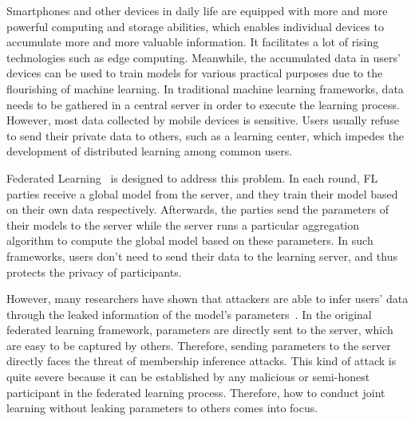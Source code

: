 Smartphones and other devices in daily life are equipped with more and more powerful computing and storage abilities, which enables individual devices to accumulate more and more valuable information. It facilitates a lot of rising technologies such as edge computing. Meanwhile, the accumulated data in users' devices can be used to train models for various practical purposes due to the flourishing of machine learning. In traditional machine learning frameworks, data needs to be gathered in a central server in order to execute the learning process. However, most data collected by mobile devices is sensitive. Users usually refuse to send their private data to others, such as a learning center, which impedes the development of distributed learning among common users.

Federated Learning~\cite{mcmahan2016communicationefficient} is designed to address this problem. In each round, FL parties receive a global model from the server, and they train their model based on their own data respectively. Afterwards, the parties send the parameters of their models to the server while the server runs a particular aggregation algorithm to compute the global model based on these parameters. In such frameworks, users don't need to send their data to the learning server, and thus protects the privacy of participants.

However, many researchers have shown that attackers are able to infer users' data through the leaked information of the model's parameters~\cite{Beyond, Leakage}. In the original federated learning framework, parameters are directly sent to the server, which are easy to be captured by others. Therefore, sending parameters to the server directly faces the threat of membership inference attacks. This kind of attack is quite severe because it can be established by any malicious or semi-honest participant in the federated learning process. Therefore, how to conduct joint learning without leaking parameters to others comes into focus.

